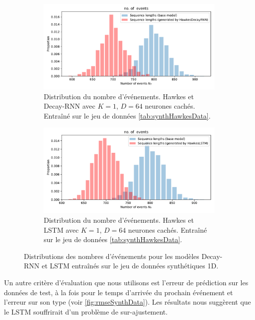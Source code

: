 \documentclass[../main.tex]{subfiles}
\begin{document}
\begin{figure}[ht]
	\begin{subfigure}{\linewidth}
		\includegraphics[width=\linewidth]{../results/length_distrib_HawkesDecayRNN-1d-hidden_64-20181206-234848.pdf}
		\caption{Distribution du nombre d'événements. Hawkes et Decay-RNN avec $K=1$, $D=64$ neurones cachés. Entraîné sur le jeu de données \autoref{tab:synthHawkesData}.}\label{fig:1DRNNlengthDistrib}
	\end{subfigure}
	\begin{subfigure}{\linewidth}
		\includegraphics[width=\linewidth]{../results/length_distrib_HawkesLSTM-1d-hidden64-20181206-235311.pdf}
		\caption{Distribution du nombre d'événements. Hawkes et LSTM avec $K=1$, $D=64$ neurones cachés. Entraîné sur le jeu de données \autoref{tab:synthHawkesData}.}\label{fig:1DLSTMlengthDistrib}	
	\end{subfigure}
	\caption{Distributions des nombres d'événements pour les modèles Decay-RNN et LSTM entraînés sur le jeu de données synthétiques 1D.}\label{fig:1DlengthDistrib}
\end{figure}

Un autre critère d'évaluation que nous utilisons est l'erreur de prédiction sur les données de test, à la fois pour le temps d'arrivée du prochain événement et l'erreur sur son type (voir \autoref{fig:rmseSynthData}). Les résultats nous suggèrent que le LSTM souffrirait d'un problème de sur-ajustement.
\end{document}

